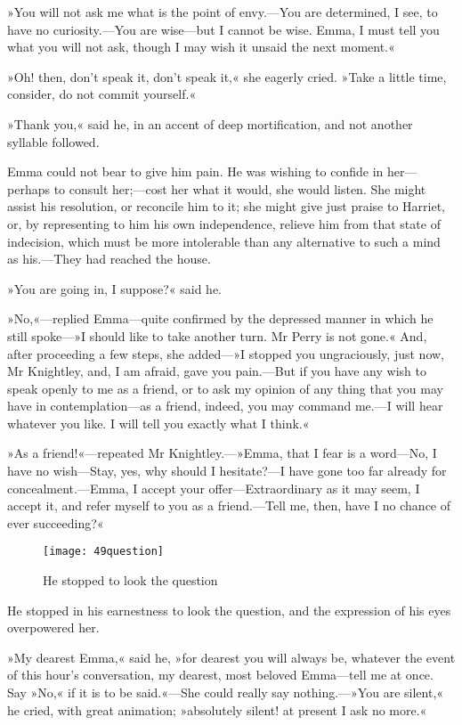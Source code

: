 »You will not ask me what is the point of envy.—You are determined, I see, to have no curiosity.—You are wise—but I cannot be wise. Emma, I must tell you what you will not ask, though I may wish it unsaid the next moment.«

»Oh! then, don't speak it, don't speak it,« she eagerly cried. »Take a little time, consider, do not commit yourself.«

»Thank you,« said he, in an accent of deep mortification, and not another syllable followed.

Emma could not bear to give him pain. He was wishing to confide in her—perhaps to consult her;—cost her what it would, she would listen. She might assist his resolution, or reconcile him to it; she might give just praise to Harriet, or, by representing to him his own independence, relieve him from that state of indecision, which must be more intolerable than any alternative to such a mind as his.—They had reached the house.

»You are going in, I suppose?« said he.

»No,«—replied Emma—quite confirmed by the depressed manner in which he still spoke—»I should like to take another turn. Mr Perry is not gone.« And, after proceeding a few steps, she added—»I stopped you ungraciously, just now, Mr Knightley, and, I am afraid, gave you pain.—But if you have any wish to speak openly to me as a friend, or to ask my opinion of any thing that you may have in contemplation—as a friend, indeed, you may command me.—I will hear whatever you like. I will tell you exactly what I think.«

»As a friend!«—repeated Mr Knightley.—»Emma, that I fear is a word—No, I have no wish—Stay, yes, why should I hesitate?—I have gone too far already for concealment.—Emma, I accept your offer—Extraordinary as it may seem, I accept it, and refer myself to you as a friend.—Tell me, then, have I no chance of ever succeeding?«

\begin{figure}[tbph]
\centering
\texttt{[image: 49question]}
\caption{He stopped to look the question}
\end{figure}

He stopped in his earnestness to look the question, and the expression of his eyes overpowered her.

»My dearest Emma,« said he, »for dearest you will always be, whatever the event of this hour's conversation, my dearest, most beloved Emma—tell me at once. Say »No,« if it is to be said.«—She could really say nothing.—»You are silent,« he cried, with great animation; »absolutely silent! at present I ask no more.«

